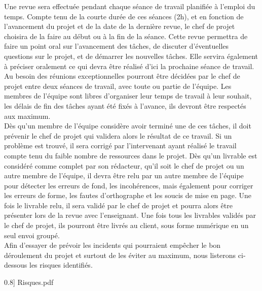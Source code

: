 Une revue sera effectuée pendant chaque séance de travail planifiée à l'emploi du temps. Compte tenu de la courte durée de ces séances (2h), et en fonction de l'avancement du projet et de la date de la dernière revue, le chef de projet choisira de la faire au début ou à la fin de la séance. Cette revue permettra de faire un point oral sur l'avancement des tâches, de discuter d'éventuelles questions sur le projet, et de démarrer les nouvelles tâches. Elle servira également à préciser oralement ce qui devra être réalisé d'ici la prochaine séance de travail. Au besoin des réunions exceptionnelles pourront être décidées par le chef de projet entre deux séances de travail, avec toute ou partie de l'équipe. Les membres de l'équipe sont libres d'organiser leur temps de travail à leur souhait, les délais de fin des tâches ayant été fixés à l'avance, ils devront être respectés aux maximum.\\
Dès qu'un membre de l'équipe considère avoir terminé une de ces tâches, il doit prévenir le chef de projet qui validera alors le résultat de ce travail. Si un problème est trouvé, il sera corrigé par l'intervenant ayant réalisé le travail compte tenu du faible nombre de ressources dans le projet. Dès qu'un livrable est considéré comme complet par son rédacteur, qu'il soit le chef de projet ou un autre membre de l'équipe, il devra être relu par un autre membre de l'équipe pour détecter les erreurs de fond, les incohérences, mais également pour corriger les erreurs de forme, les fautes d'orthographe et les soucis de mise en page. Une fois le livrable relu, il sera validé par le chef de projet et pourra alors être présenter lors de la revue avec l'enseignant. Une fois tous les livrables validés par le chef de projet, ils pourront être livrés au client, sous forme numérique en un seul envoi groupé.\\

Afin d'essayer de prévoir les incidents qui pourraient empêcher le bon déroulement du projet et surtout de les éviter au maximum, nous listerons ci-dessous les risques identifiés.

\newpage
 0.8] {Risques.pdf}
